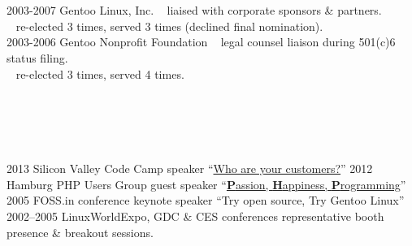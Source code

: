 \documentclass[]{friggeri-cv} %
\begin{document}
\section{{} {} {\normalsize {}~~}}
\begin{entrylist}
\entry
{2003-2007}
{Gentoo Linux, Inc.}
{}
{{\tiny {}} ~ liaised with corporate sponsors \& partners.\\
{\tiny {}} ~ re-elected 3 times, served 3 times (declined final nomination).\\}
\entry
{2003-2006}
{Gentoo Nonprofit Foundation}
{}
{{\tiny {}} ~ legal counsel liaison during 501(c)6 status filing.\\
{\tiny {}} ~ re-elected 3 times, served 4 times.}
\end{entrylist}
\section{{} {} {\normalsize {}~~}}

\begin{entrylist}
\entry
{2013}
{Silicon Valley Code Camp}
{speaker}
{``\href{http://www.siliconvalley-codecamp.com/Session/2013/who-are-your-customers}{Who are your customers?}''}
\entry
{2012}
{Hamburg PHP Users Group}
{guest speaker}
{``\href{https://speakerdeck.com/seemantk/developing-with-passion}{\textbf{P}assion, \textbf{H}appiness, \textbf{P}rogramming}''}
\entry
{2005}
{FOSS.in conference}
{keynote speaker}
{``Try open source, Try Gentoo Linux''}
\entry
{2002--2005}
{LinuxWorldExpo, GDC \& CES conferences}
{representative}
{booth presence \& breakout sessions.}
\end{entrylist}
\end{document}
